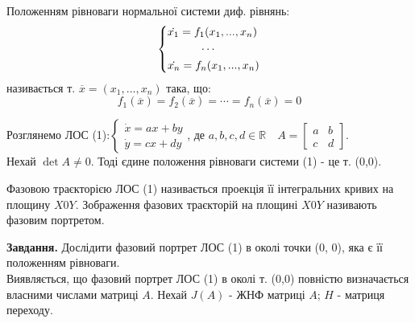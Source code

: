 \begin{defo}
    Положенням рівноваги нормальної системи диф. рівнянь:
    $$
    \begin{dcases}
        \dot{x_1} = f_1(x_1, ..., x_n)\\
        \qquad \quad \cdots\\
        \dot{x_n} = f_n(x_1, ..., x_n)
    \end{dcases}
    $$
    називається т. $\overline{x} = (x_1, ... , x_n)$ така, що:
    $$
    f_1 (\overline{x}) = f_2(\overline{x}) = \cdots = f_n(\overline{x}) =0
    $$
\end{defo}
Розглянемо ЛОС (1):$ \begin{cases}
    \dot{x} = ax + by\\
    \dot{y} = cx + dy
\end{cases}$, де $a,b,c,d \in \mathbb{R} \quad A = \begin{bmatrix}
 a & b\\
 c & d
\end{bmatrix}$.\\
Нехай $\det A \neq 0$. Тоді єдине положення рівноваги системи (1) - це т. (0,0).
\begin{defo}
    Фазовою траєкторією ЛОС (1) називається проекція її інтегральних кривих на площину $X0Y$. Зображення фазових траєкторій на площині $X0Y$ називають фазовим портретом.
\end{defo}
\textbf{Завдання.} Дослідити фазовий портрет ЛОС (1) в околі точки (0, 0), яка є її положенням рівноваги.\\

Виявляється, що фазовий портрет ЛОС (1) в околі т. (0,0) повністю визначається власними числами матриці $A$. Нехай $J(A)$ - ЖНФ матриці $A$; $H$ - матриця переходу.\\

